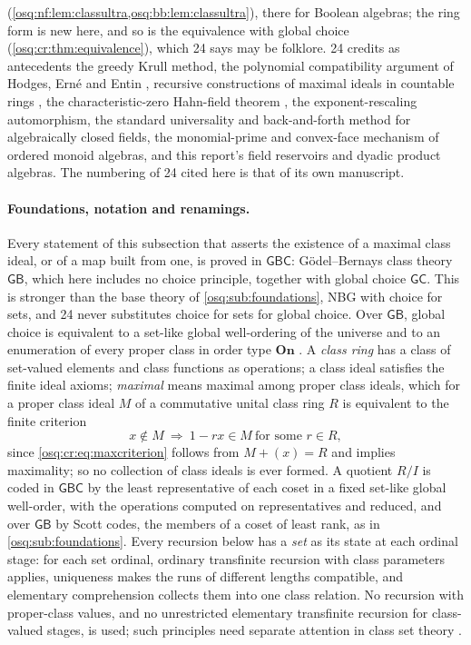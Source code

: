\documentclass[11pt,letterpaper]{article}
\numberwithin{equation}{section}
\theoremstyle{definition}
\theoremstyle{remark}
\theoremstyle{plain}
\newcommand{\On}{\mathbf{On}}
\begin{document}
(\cref{osq:nf:lem:classultra,osq:bb:lem:classultra}), there for Boolean algebras; the ring form is new here, and so is the equivalence with global
choice (\cref{osq:cr:thm:equivalence}), which 24 says may be folklore. 24 credits as antecedents the greedy Krull method, the polynomial compatibility
argument of Hodges, Ern\'e and Entin \cite{Hodges,Erne,Entin}, recursive constructions of maximal ideals in countable rings \cite{BlechschmidtSchuster},
the characteristic-zero Hahn-field theorem \cite{MacLane,KnightLange}, the exponent-rescaling automorphism, the standard universality and back-and-forth
method for algebraically closed fields, the monomial-prime and convex-face mechanism of ordered monoid algebras, and this report's field reservoirs and
dyadic product algebras. The numbering of 24 cited here is that of its own manuscript.

\paragraph{Foundations, notation and renamings.} Every statement of this subsection that asserts the existence of a maximal class ideal, or of a
map built from one, is proved in $\mathsf{GBC}$: G\"odel--Bernays class theory $\mathsf{GB}$, which here includes no choice principle, together with
global choice $\mathsf{GC}$. This is stronger than the base theory of \cref{osq:sub:foundations}, NBG with choice for sets, and 24 never substitutes
choice for sets for global choice. Over $\mathsf{GB}$, global choice is equivalent to a set-like global well-ordering of the universe and to an
enumeration of every proper class in order type $\On$ \cite{HamkinsGC}. A \emph{class ring} has a class of set-valued elements and class functions as
operations; a class ideal satisfies the finite ideal axioms; \emph{maximal} means maximal among proper class ideals, which for a proper class ideal
$M$ of a commutative unital class ring $R$ is equivalent to the finite criterion
\begin{equation}\label{osq:cr:eq:maxcriterion}
 x\notin M\ \Longrightarrow\ 1-rx\in M\ \text{for some }r\in R,
\end{equation}
since \eqref{osq:cr:eq:maxcriterion} follows from $M+(x)=R$ and implies maximality; so no collection of class ideals is ever formed. A quotient
$R/I$ is coded in $\mathsf{GBC}$ by the least representative of each coset in a fixed set-like global well-order, with the operations computed on
representatives and reduced, and over $\mathsf{GB}$ by Scott codes, the members of a coset of least rank, as in \cref{osq:sub:foundations}. Every
recursion below has a \emph{set} as its state at each ordinal stage: for each set ordinal, ordinary transfinite recursion with class parameters
applies, uniqueness makes the runs of different lengths compatible, and elementary comprehension collects them into one class relation. No recursion
with proper-class values, and no unrestricted elementary transfinite recursion for class-valued stages, is used; such principles need separate
attention in class set theory \cite{GHHSW}.
\end{document}

